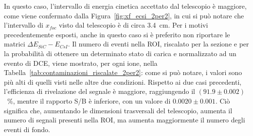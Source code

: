 In questo caso, l'intervallo di energia cinetica accettato dal telescopio è maggiore, come viene confermato dalla Figura~\ref{fig:xf_ecsi_2per2}, in cui si può notare che l'intervallo di $x_{foc}$ visto dal telescopio è di circa 3.4~cm.
Per i motivi precedentemente esposti, anche in questo caso si è preferito non riportare le matrici $\Delta E_{SiC} - E_{CsI}$.
Il numero di eventi nella ROI, riscalato per la sezione e per la probabilità di ottenere un determinato stato di carica e normalizzato ad un evento di DCE, viene mostrato, per ogni ione, nella Tabella~\ref{tab:contaminazioni_riscalate_2per2}: come si può notare, i valori sono più alti di quelli visti nelle altre due condizioni.
Rispetto ai due casi precedenti, l'efficienza di rivelazione del segnale è maggiore, raggiungendo il $(91.9 \pm 0.002)$~\%, mentre il rapporto S/B è inferiore, con un valore di $0.0020 \pm 0.001$.
Ciò significa che, aumentando le dimensioni trasversali del telescopio, aumenta il numero di segnali presenti nella ROI, ma aumenta maggiormente il numero degli eventi di fondo.









